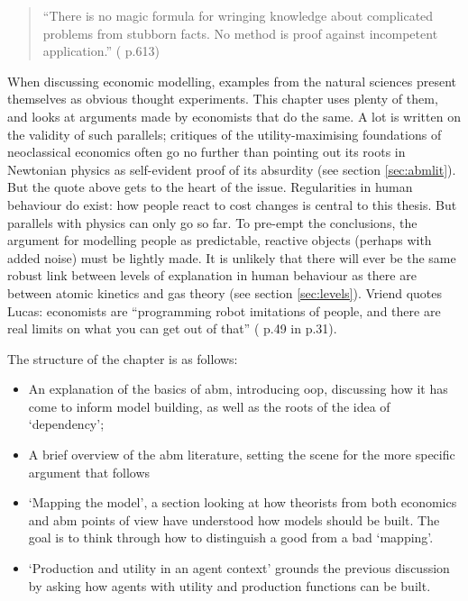 \begin{quote}
``There is no magic formula for wringing knowledge about complicated problems from stubborn facts. No method is proof against incompetent application.'' (\citealt{friedman_lange_1953} p.613)
\end{quote}

When discussing economic modelling, examples from the natural sciences present themselves as obvious thought experiments. This chapter uses plenty of them, and looks at arguments made by economists that do the same. A lot is written on the validity of such parallels; critiques of the utility-maximising foundations of neoclassical economics often go no further than pointing out its roots in Newtonian physics as self-evident proof of its absurdity (see section \ref{sec:abmlit}). But the quote above gets to the heart of the issue. Regularities in human behaviour do exist: how people react to cost changes is central to this thesis. But parallels with physics can only go so far. To pre-empt the conclusions, the argument for modelling people as predictable, reactive objects (perhaps with added noise) must be lightly made. It is unlikely that there will ever be the same robust link between levels of explanation in human behaviour as there are between atomic kinetics and gas theory (see section \ref{sec:levels}). Vriend quotes Lucas: economists are ``programming robot imitations of people, and there are real limits on what you can get out of that'' (\citealt{klamer_new_1984} p.49 in \citealt{hillebrand_artificial_1994} p.31).

The structure of the chapter is as follows:

\begin{itemize}
	\item An explanation of the basics of \gls{abm}, introducing \gls{oop}, discussing how it has come to inform model building, as well as the roots of the idea of `dependency';
	\item A brief overview of the \gls{abm} literature, setting the scene for the more specific argument that follows
	\item `Mapping the model', a section looking at how theorists from both economics and \gls{abm} points of view have understood how models should be built. The goal is to think through how to distinguish a good from a bad `mapping'.
	\item `Production and utility in an agent context' grounds the previous discussion by asking how agents with utility and production functions can be built.
\end{itemize}


